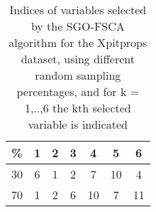 \begin{table}
	\begin{center}
		\begin{tabular}{c c c c c c c}
			\% & 1 & 2 & 3 & 4 & 5 & 6 \\
			\hline
			30 & 6 & 1 & 2 & 7 & 10 & 4 \\
			70 & 1 & 2 & 6 & 10 & 7 & 11 \\
		\end{tabular}
	\end{center}
	\caption{Indices of variables selected by the SGO-FSCA algorithm for the Xpitprops dataset, using different random sampling percentages, and for k = 1,..,6 the kth selected variable is indicated}
\end{table}
